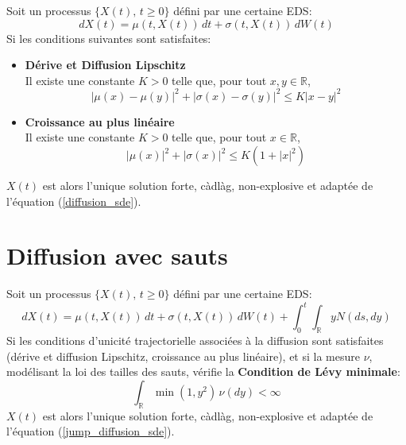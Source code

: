 Soit un processus \( \{X(t),\, t \geq 0\} \) défini par une certaine \ac{EDS}:
\begin{equation}\label{diffusion_sde}
    dX(t) = \mu(t,X(t))\,dt + \sigma(t,X(t))\,dW(t)
\end{equation}
Si les conditions suivantes sont satisfaites:
\begin{itemize}
    \item \textbf{Dérive et Diffusion Lipschitz} \\
    Il existe une constante \( K > 0 \) telle que, pour tout \( x,y \in \mathds{R} \),
    \[
    |\mu(x)-\mu(y)|^2+|\sigma(x)-\sigma(y)|^2\leq K|x-y|^2
    \]
    \item \textbf{Croissance au plus linéaire} \\
    Il existe une constante \( K > 0 \) telle que, pour tout \( x \in \mathds{R} \),
    \[
    |\mu(x)|^2 + |\sigma(x)|^2 \leq K(1 + |x|^2)
    \]
\end{itemize}
$X(t)$ est alors l'unique solution forte, càdlàg, non-explosive  et adaptée de l'équation (\ref{diffusion_sde}).

\section*{Diffusion avec sauts}
Soit un processus \( \{X(t),\, t \geq 0\} \) défini par une certaine \ac{EDS}:
\begin{equation}\label{jump_diffusion_sde}
    dX(t) = \mu(t, X(t))\,dt + \sigma(t, X(t))\,dW(t) + \int_0^t\int_{\mathds{R}} yN(ds,dy)
\end{equation}
Si les conditions d'unicité trajectorielle associées à la diffusion sont satisfaites (dérive et diffusion Lipschitz, croissance au plus linéaire), et si la mesure \( \nu \), modélisant la loi des tailles des sauts, vérifie la \textbf{Condition de Lévy minimale}:
\[
\int_{\mathds{R}}\min(1, y^2)\, \nu(dy) < \infty
\]
$X(t)$ est alors l'unique solution forte, càdlàg, non-explosive et adaptée de l'équation (\ref{jump_diffusion_sde}).